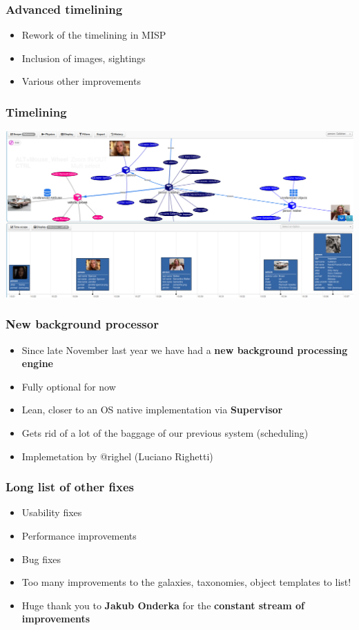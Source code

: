 \begin{frame}
  \frametitle{Advanced timelining}
  \begin{itemize}
     \item Rework of the timelining in MISP
     \item Inclusion of images, sightings
     \item Various other improvements
  \end{itemize}
\end{frame}

\begin{frame}
\frametitle{Timelining}
\includegraphics[scale=0.2]{images/timelining.png}
\end{frame}

\begin{frame}
  \frametitle{New background processor}
  \begin{itemize}
     \item Since late November last year we have had a {\bf new background processing engine}
     \item Fully optional for now
     \item Lean, closer to an OS native implementation via {\bf Supervisor}
     \item Gets rid of a lot of the baggage of our previous system (scheduling)
     \item Implemetation by @righel (Luciano Righetti)
  \end{itemize}
\end{frame}


\begin{frame}
  \frametitle{Long list of other fixes}
  \begin{itemize}
     \item Usability fixes
     \item Performance improvements
     \item Bug fixes
     \item Too many improvements to the galaxies, taxonomies, object templates to list!
     \item Huge thank you to {\bf Jakub Onderka} for the {\bf constant stream of improvements}
  \end{itemize}
\end{frame}

